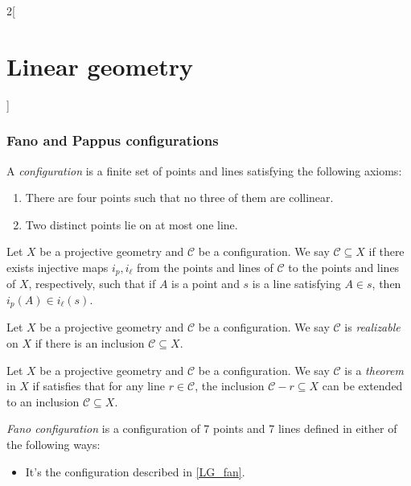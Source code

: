 \documentclass[../../../main_math.tex]{subfiles}
\begin{document}
\begin{multicols}{2}[\section{Linear geometry}]
  \subsubsection{Fano and Pappus configurations}
  \begin{definition}
    A \emph{configuration} is a finite set of points and lines satisfying the following axioms:
    \begin{enumerate}
      \item There are four points such that no three of them are collinear.
      \item Two distinct points lie on at most one line.
    \end{enumerate}
  \end{definition}
  \begin{definition}
    Let $X$ be a projective geometry and $\mathcal{C}$ be a configuration. We say $\mathcal{C}\subseteq X$ if there exists injective maps $i_p,i_\ell$ from the points and lines of $\mathcal{C}$ to the points and lines of $X$, respectively, such that if $A$ is a point and $s$ is a line satisfying $A\in s$, then $i_p(A)\in i_\ell(s)$.
  \end{definition}
  \begin{definition}
    Let $X$ be a projective geometry and $\mathcal{C}$ be a configuration. We say $\mathcal{C}$ is \emph{realizable} on $X$ if there is an inclusion $\mathcal{C}\subseteq X$.
  \end{definition}
  \begin{definition}
    Let $X$ be a projective geometry and $\mathcal{C}$ be a configuration. We say $\mathcal{C}$ is a \emph{theorem} in $X$ if satisfies that for any line $r\in\mathcal{C}$, the inclusion $\mathcal{C}-r\subseteq X$ can be extended to an inclusion $\mathcal{C}\subseteq X$.
  \end{definition}
  \begin{definition}
    \emph{Fano configuration} is a configuration of 7 points and 7 lines defined in either of the following ways:
    \begin{itemize}
      \item It's the configuration described in \cref{LG_fan}.
            \begin{center}
              \begin{minipage}{\linewidth}
                \centering
                
                \label{LG_fan}
              \end{minipage}

\end{center}
\end{itemize}
\end{definition}
\end{multicols}
\end{document}
